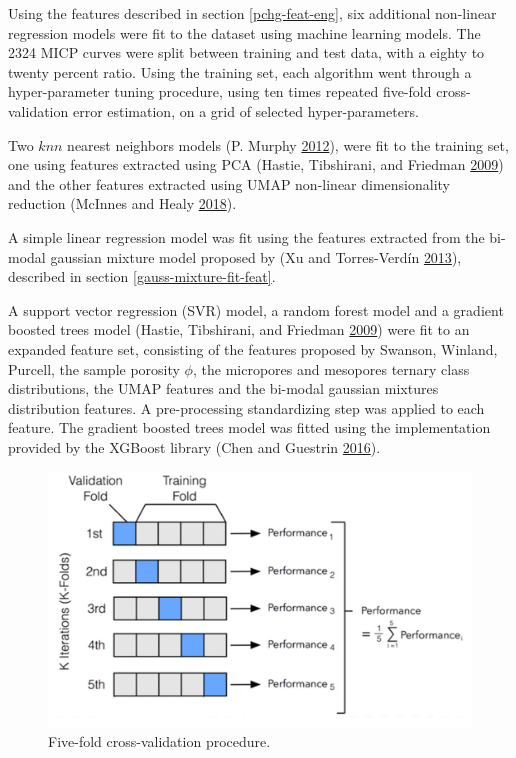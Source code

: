 \documentclass[english,msc,numbers]{coppe}
\begin{document}
  Using the features described in section \ref{pchg-feat-eng}, six additional non-linear regression models were fit to the dataset using machine learning models. The 2324 MICP curves were split between training and test data, with a eighty to twenty percent ratio. Using the training set, each algorithm went through a hyper-parameter tuning procedure, using ten times repeated five-fold cross-validation error estimation, on a grid of selected hyper-parameters.
  
  Two \(knn\) nearest neighbors models (P. Murphy \protect\hyperlink{ref-P.Murphy2012}{2012}), were fit to the training set, one using features extracted using PCA (Hastie, Tibshirani, and Friedman \protect\hyperlink{ref-Hastie2009}{2009}) and the other features extracted using UMAP non-linear dimensionality reduction (McInnes and Healy \protect\hyperlink{ref-McInnes2018}{2018}).
  
  A simple linear regression model was fit using the features extracted from the bi-modal gaussian mixture model proposed by (Xu and Torres-Verdín \protect\hyperlink{ref-Xu2013}{2013}), described in section \ref{gauss-mixture-fit-feat}.
  
  A support vector regression (SVR) model, a random forest model and a gradient boosted trees model (Hastie, Tibshirani, and Friedman \protect\hyperlink{ref-Hastie2009}{2009}) were fit to an expanded feature set, consisting of the features proposed by Swanson, Winland, Purcell, the sample porosity \(\phi\), the micropores and mesopores ternary class distributions, the UMAP features and the bi-modal gaussian mixtures distribution features. A pre-processing standardizing step was applied to each feature. The gradient boosted trees model was fitted using the implementation provided by the XGBoost library (Chen and Guestrin \protect\hyperlink{ref-Chen2016}{2016}).
  \begin{figure}
  
  {\centering \includegraphics[width=0.7\linewidth]{figure/3-11-cross-validation} 
  
  }
  
  \caption{Five-fold cross-validation procedure.}\label{fig:cross-validation}
  \end{figure}
  \par
  
\end{document}
